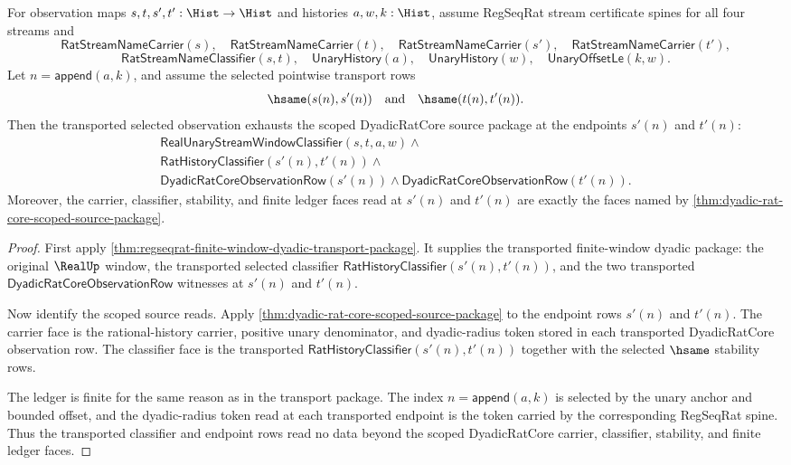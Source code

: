 \begin{theorem}
\label{thm:regseqrat-finite-window-transported-dyadic-source-exhaustion}
For observation maps $s,t,s',t':\Hist\to\Hist$ and histories $a,w,k:\Hist$,
assume RegSeqRat stream certificate spines for all four streams and
$$
\mathsf{RatStreamNameCarrier}(s),\quad
\mathsf{RatStreamNameCarrier}(t),\quad
\mathsf{RatStreamNameCarrier}(s'),\quad
\mathsf{RatStreamNameCarrier}(t'),
$$
$$
\mathsf{RatStreamNameClassifier}(s,t),\quad
\mathsf{UnaryHistory}(a),\quad
\mathsf{UnaryHistory}(w),\quad
\mathsf{UnaryOffsetLe}(k,w).
$$
Let $n=\mathsf{append}(a,k)$, and assume the selected pointwise transport rows
$$
\hsame(s(n),s'(n))
\quad\text{and}\quad
\hsame(t(n),t'(n)).
$$
Then the transported selected observation exhausts the scoped DyadicRatCore
source package at the endpoints $s'(n)$ and $t'(n)$:
$$
\begin{array}{l}
\mathsf{RealUnaryStreamWindowClassifier}(s,t,a,w)\land\\
\mathsf{RatHistoryClassifier}(s'(n),t'(n))\land\\
\mathsf{DyadicRatCoreObservationRow}(s'(n))\land
\mathsf{DyadicRatCoreObservationRow}(t'(n)).
\end{array}
$$
Moreover, the carrier, classifier, stability, and finite ledger faces read at
$s'(n)$ and $t'(n)$ are exactly the faces named by
\autoref{thm:dyadic-rat-core-scoped-source-package}.
\end{theorem}
\begin{proof}
First apply
\autoref{thm:regseqrat-finite-window-dyadic-transport-package}. It supplies
the transported finite-window dyadic package: the original
$\RealUp$ window, the transported selected classifier
$\mathsf{RatHistoryClassifier}(s'(n),t'(n))$, and the two transported
$\mathsf{DyadicRatCoreObservationRow}$ witnesses at $s'(n)$ and $t'(n)$.

Now identify the scoped source reads. Apply
\autoref{thm:dyadic-rat-core-scoped-source-package} to the endpoint rows
$s'(n)$ and $t'(n)$. The carrier face is the rational-history carrier,
positive unary denominator, and dyadic-radius token stored in each transported
DyadicRatCore observation row. The classifier face is the transported
$\mathsf{RatHistoryClassifier}(s'(n),t'(n))$ together with the selected
$\hsame$ stability rows.

The ledger is finite for the same reason as in the transport package. The
index $n=\mathsf{append}(a,k)$ is selected by the unary anchor and bounded
offset, and the dyadic-radius token read at each transported endpoint is the
token carried by the corresponding RegSeqRat spine. Thus the transported
classifier and endpoint rows read no data beyond the scoped DyadicRatCore
carrier, classifier, stability, and finite ledger faces.
\end{proof}

